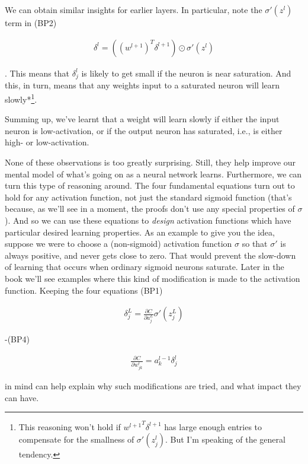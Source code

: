 We can obtain similar insights for earlier layers. In particular, note the $\sigma'(z^l)$ term in (BP2)

\begin{align*}
\delta^l = ((w^{l+1})^T \delta^{l+1}) \odot \sigma'(z^l) \nonumber
\end{align*}

\noindent. This means that $\delta^l_j$ is likely to get small if the neuron is near saturation. And this, in turn, means that any weights input to a saturated neuron will learn slowly*\footnote{This reasoning won't hold if ${w^{l+1}}^T \delta^{l+1}$ has large enough entries to compensate for the smallness of $\sigma'(z^l_j)$. But I'm speaking of the general tendency.}.


Summing up, we've learnt that a weight will learn slowly if either the input neuron is low-activation, or if the output neuron has saturated, i.e., is either high- or low-activation.


None of these observations is too greatly surprising. Still, they help improve our mental model of what's going on as a neural network learns. Furthermore, we can turn this type of reasoning around. The four fundamental equations turn out to hold for any activation function, not just the standard sigmoid function (that's because, as we'll see in a moment, the proofs don't use any special properties of $\sigma$). And so we can use these equations to \emph{design} activation functions which have particular desired learning properties. As an example to give you the idea, suppose we were to choose a (non-sigmoid) activation function $\sigma$ so that $\sigma'$ is always positive, and never gets close to zero. That would prevent the slow-down of learning that occurs when ordinary sigmoid neurons saturate. Later in the book we'll see examples where this kind of modification is made to the activation function. Keeping the four equations (BP1)

\begin{align*}
\delta^L_j = \frac{\partial C}{\partial a^L_j} \sigma'(z^L_j) \nonumber
\end{align*}

\noindent -(BP4)

\begin{align*}
\frac{\partial C}{\partial w^l_{jk}} = a^{l-1}_k \delta^l_j \nonumber
\end{align*}

\noindent in mind can help explain why such modifications are tried, and what impact they can have.

